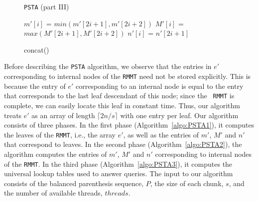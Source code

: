 \begin{figure}[t!]
\begin{minipage}[t]{.51\textwidth}
\begin{algorithm}[H]
{      
  }
  \vspace{1ex}
  \caption{{\tt PSTA} (part III)}
  \label{algo:PSTA3}
  \end{algorithm}
  \medskip
\begin{function}[H]
  \LinesNumbered
  \SetAlgoNoEnd
  \DontPrintSemicolon
  \SetAlgoLined
  \BlankLine%
   $m'[i]$ = $min(m'[2i+1], m'[2i+2])$\;
   $M'[i]$ = $max(M'[2i+1], M'[2i+2])$\;
   $n'[i]$ = $n'[2i+1]$\;
  \vspace{1ex}
  \caption{concat()}
  \label{func:concat}
\end{function}
\end{minipage}
\end{figure}

Before describing the {\tt PSTA} algorithm, we observe
that the entries in $e'$ corresponding to internal nodes of the
{\tt RMMT} need not be stored explicitly.  This is because the entry
of $e'$ corresponding to an internal node is equal to the entry that
corresponds to the last leaf descendant of this node; since the {\tt
  RMMT} is complete, we can easily locate this leaf in constant
time.  Thus, our algorithm treats $e'$ as an
array of length $\lceil 2n / s\rceil$ with one entry per leaf.
Our algorithm consists of three phases. In the first
phase (Algorithm~\ref{algo:PSTA1}), it computes the leaves of the {\tt RMMT},
i.e., the array $e'$,
as well as the entries of $m'$, $M'$ and $n'$
that correspond to leaves.  In the second phase (Algorithm~\ref{algo:PSTA2}),
the algorithm computes the
entries of $m'$, $M'$ and $n'$ corresponding
to internal nodes of the {\tt RMMT}.
In the third phase (Algorithm~\ref{algo:PSTA3}), it computes the universal
lookup tables used to answer queries.
The input to our algorithm consists of the balanced parenthesis sequence,
$P$, the size of each chunk, $s$, and the number of available threads,
$\mathit{threads}$.

